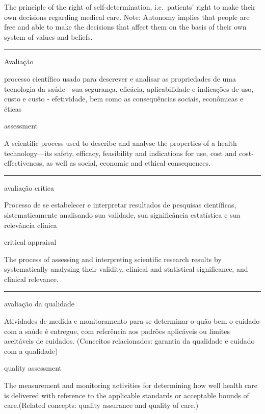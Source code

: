 \documentclass[
]{book}
\begin{document}
The principle of the right of self-determination, i.e.~patients' right to make their own decisions regarding medical care. Note: Autonomy implies that people are free and able to make the decisions that affect them on the basis of their own system of values and beliefs.

\begin{center}\rule{0.5\linewidth}{0.5pt}\end{center}

Avaliação

processo científico usado para descrever e analisar as propriedades de uma tecnologia da saúde - sua segurança, eficácia, aplicabilidade e indicações de uso, custo e custo - efetividade, bem como as consequências sociais, econômicas e éticas

assessment

A scientific process used to describe and analyse the properties of a health technology---its safety, efficacy, feasibility and indications for use, cost and cost-effectiveness, as well as social, economic and ethical consequences.

\begin{center}\rule{0.5\linewidth}{0.5pt}\end{center}

avaliação crítica

Processo de se estabelecer e interpretar resultados de pesquisas científicas, sistematicamente analisando sua validade, sua significância estatística e sua relevância clínica

critical appraisal

The process of assessing and interpreting scientific research results by systematically analysing their validity, clinical and statistical significance, and clinical relevance.

\begin{center}\rule{0.5\linewidth}{0.5pt}\end{center}

avaliação da qualidade

Atividades de medida e monitoramento para se determinar o quão bem o cuidado com a saúde é entregue, com referência aos padrões aplicáveis ou limites aceitáveis de cuidados. (Conceitos relacionados: garantia da qualidade e cuidado com a qualidade)

quality assessment

The measurement and monitoring activities for determining how well health care is delivered with reference to the applicable standards or acceptable bounds of care.(Related concepts: quality assurance and quality of care.)
\end{document}
